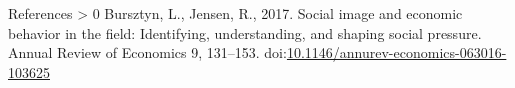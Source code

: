 \documentclass[
  ignorenonframetext,
]{beamer}
\newlength{\cslhangindent}
\newenvironment{CSLReferences}[3] %
 {%
  \setlength{\parindent}{0pt}
  \ifodd #1 \everypar{\setlength{\hangindent}{\cslhangindent}}\ignorespaces\fi
  \ifnum #2 > 0
  \setlength{\parskip}{#2\baselineskip}
  \fi
 }%
 {}
\begin{document}
\begin{frame}{References}
\protect\hypertarget{references}{}
\hypertarget{refs}{}
\begin{CSLReferences}{1}{0}
\leavevmode\hypertarget{ref-Bursztyn2017}{}%
Bursztyn, L., Jensen, R., 2017. Social image and economic behavior in the field: Identifying, understanding, and shaping social pressure. Annual Review of Economics 9, 131--153. doi:\href{https://doi.org/10.1146/annurev-economics-063016-103625}{10.1146/annurev-economics-063016-103625}

\end{CSLReferences}
\end{frame}
\end{document}
